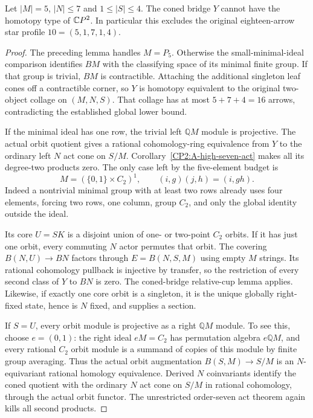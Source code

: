 \begin{theorem}
\label{CP2:A-star-five-seven-four}
Let $|M|=5$, $|N|\le7$ and $1\le|S|\le4$.  The
coned bridge $Y$ cannot have the homotopy type of
$\mathbb{C}P^2$.  In particular this excludes the original
eighteen-arrow star profile $10=(5,1,7,1,4)$.
\end{theorem}
\begin{proof}
The preceding lemma handles $M=P_5$.  Otherwise the
small-minimal-ideal comparison identifies $BM$ with the
classifying space of its minimal finite group.  If that
group is trivial, $BM$ is contractible.  Attaching the
additional singleton leaf cones off a contractible
corner, so $Y$ is homotopy equivalent to the original
two-object collage on $(M,N,S)$.  That collage has at
most $5+7+4=16$ arrows, contradicting the established
global lower bound.

If the minimal ideal has one row, the trivial left
$\mathbb QM$ module is projective.  The actual orbit
quotient gives a rational cohomology-ring equivalence
from $Y$ to the ordinary left $N$ act cone on $S/M$.
Corollary~\ref{CP2:A-high-seven-act} makes all its
degree-two products zero.  The only case left by the
five-element budget is
\[
 M=(\{0,1\}\times C_2)^1,\qquad
 (i,g)(j,h)=(i,gh).
\]
Indeed a nontrivial minimal group with at least two
rows already uses four elements, forcing two rows,
one column, group $C_2$, and only the global identity
outside the ideal.

Its core $U=SK$ is a disjoint union of one- or two-point
$C_2$ orbits.  If it has just one orbit, every commuting
$N$ actor permutes that orbit.  The covering
$B(N,U)\to BN$ factors through $E=B(N,S,M)$ using
empty $M$ strings.  Its rational cohomology pullback is
injective by transfer, so the restriction of every
second class of $Y$ to $BN$ is zero.  The coned-bridge
relative-cup lemma applies.  Likewise, if exactly one
core orbit is a singleton, it is the unique globally
right-fixed state, hence is $N$ fixed, and supplies a
section.

If $S=U$, every orbit module is projective as a right
$\mathbb QM$ module.  To see this, choose
$e=(0,1)$: the right ideal $eM=C_2$ has permutation
algebra $e\mathbb QM$, and every rational $C_2$ orbit
module is a summand of copies of this module by finite
group averaging.  Thus the actual orbit augmentation
$B(S,M)\to S/M$ is an $N$-equivariant rational homology
equivalence.  Derived $N$ coinvariants identify the
coned quotient with the ordinary $N$ act cone on $S/M$
in rational cohomology, through the actual orbit functor.
The unrestricted order-seven act theorem again kills
all second products.


\end{proof}
